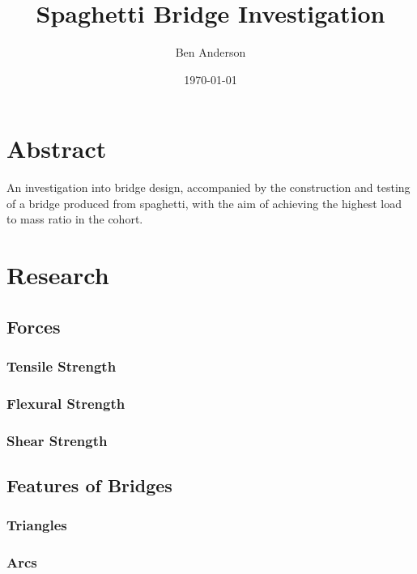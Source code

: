 \documentclass[a4paper,11pt]{article}
\begin{document}
\title{Spaghetti Bridge Investigation}
\author{Ben Anderson}
\date{\today}
\maketitle

\pagebreak

\tableofcontents
\pagebreak


\section{Abstract}

An investigation into bridge design, accompanied by the construction and testing
of a bridge produced from spaghetti, with the aim of achieving the highest load
to mass ratio in the cohort.




\section{Research}

\subsection{Forces}

\subsubsection{Tensile Strength}

\subsubsection{Flexural Strength}

\subsubsection{Shear Strength}

\subsection{Features of Bridges}

\subsubsection{Triangles}

\subsubsection{Arcs}
\end{document}
